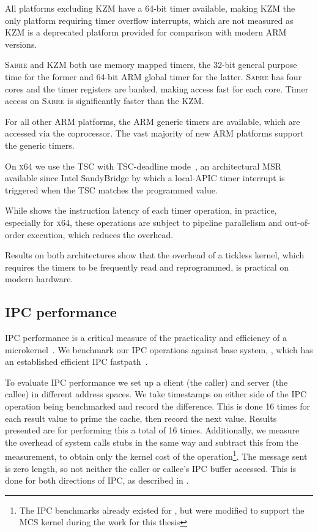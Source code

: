 All platforms excluding \textsc{KZM} have a 64-bit timer available, making \textsc{KZM} the only platform requiring
timer overflow interrupts, which are not measured as \textsc{KZM} is a deprecated platform provided for comparison
with modern ARM versions.

\textsc{Sabre} and \textsc{KZM} both use memory mapped timers, the 32-bit general purpose time for the former and
64-bit ARM global timer for the latter. \textsc{Sabre} has four cores and the timer registers are banked,
making access fast for each core. Timer access on \textsc{Sabre} is significantly faster than the
\textsc{KZM}. 

For all other ARM platforms, the ARM generic timers are available, which are accessed via the
coprocessor. The vast majority of new ARM platforms support the generic timers. 

On \textsc{x64} we use the \gls{TSC} with \gls{TSC}-deadline mode~\citep{Intel_64_IA-32:asdmspg_325384}, an architectural \gls{MSR} available since
Intel SandyBridge by which a local-APIC timer interrupt is triggered when the \gls{TSC} matches the
programmed value. 

While  shows the instruction latency of each timer operation, in practice, especially
for \textsc{x64}, these operations are subject to pipeline parallelism and out-of-order execution, which
reduces the overhead.

Results on both architectures show that the overhead of a tickless kernel, which requires the timers
to be frequently read and reprogrammed, is practical on modern hardware.

\subsection{IPC performance}

\Gls{IPC} performance is a critical measure of the practicality and efficiency of a
microkernel~\citep{Liedtke_95}. We benchmark our \gls{IPC} operations against base system, \selfour,
which has an established efficient \gls{IPC} fastpath~\citep{Elphinstone_Heiser_13}. 

To evaluate IPC performance we set up a client (the caller) and server (the callee) in different
address spaces. We take
timestamps on either side of the IPC operation being benchmarked and record the difference. This is
done 16 times for each result value to prime the cache, then record the next value. Results
presented are for performing this a total of 16 times. Additionally, we measure the overhead of
system calls stubs in the same way and subtract this from the measurement, to obtain only the kernel
cost of the operation\footnote{The \gls{IPC} benchmarks already existed for \selfour, but were modified to
    support the \gls{MCS} kernel during the work for this thesis}. The message sent is zero length, so not
neither the caller or callee's \gls{IPC} buffer accessed.
This is done for both directions of IPC, as described in . 

